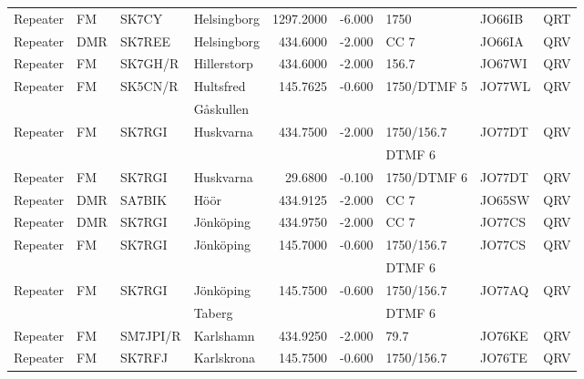 \begin{longtable}{llllrrlll}
Repeater & FM              & SK7CY    & Helsingborg  & 1297.2000    & -6.000     & 1750         & JO66IB      & QRT      \\
Repeater & DMR             & SK7REE   & Helsingborg  & 434.6000     & -2.000     & CC 7         & JO66IA      & QRV      \\
Repeater & FM              & SK7GH/R  & Hillerstorp  & 434.6000     & -2.000     & 156.7        & JO67WI      & QRV      \\
Repeater & FM              & SK5CN/R  & Hultsfred    & 145.7625     & -0.600     & 1750/DTMF 5  & JO77WL      & QRV      \\
         &                 &          & Gåskullen    &              &            &              &             &          \\
Repeater & FM              & SK7RGI   & Huskvarna    & 434.7500     & -2.000     & 1750/156.7   & JO77DT      & QRV      \\
         &                 &          &              &              &            & DTMF 6       &             &          \\
Repeater & FM              & SK7RGI   & Huskvarna    & 29.6800      & -0.100     & 1750/DTMF 6  & JO77DT      & QRV      \\
Repeater & DMR             & SA7BIK   & Höör         & 434.9125     & -2.000     & CC 7         & JO65SW      & QRV      \\
Repeater & DMR             & SK7RGI   & Jönköping    & 434.9750     & -2.000     & CC 7         & JO77CS      & QRV      \\
Repeater & FM              & SK7RGI   & Jönköping    & 145.7000     & -0.600     & 1750/156.7   & JO77CS      & QRV      \\
         &                 &          &              &              &            & DTMF 6       &             &          \\
Repeater & FM              & SK7RGI   & Jönköping    & 145.7500     & -0.600     & 1750/156.7   & JO77AQ      & QRV      \\
         &                 &          & Taberg       &              &            & DTMF 6       &             &          \\
Repeater & FM              & SM7JPI/R & Karlshamn    & 434.9250     & -2.000     & 79.7         & JO76KE      & QRV      \\
Repeater & FM              & SK7RFJ   & Karlskrona   & 145.7500     & -0.600     & 1750/156.7   & JO76TE      & QRV      \\

\end{longtable}
